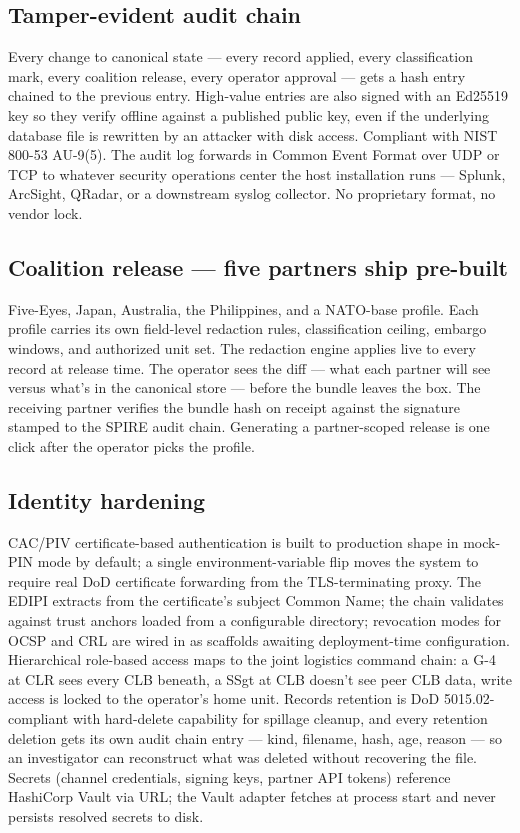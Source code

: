 \documentclass[10.5pt]{extarticle}
\begin{document}
\subsection*{Tamper-evident audit chain}
Every change to canonical state --- every record applied, every
classification mark, every coalition release, every operator
approval --- gets a hash entry chained to the previous entry. High-value
entries are also signed with an Ed25519 key so they verify offline
against a published public key, even if the underlying database file
is rewritten by an attacker with disk access. Compliant with NIST
800-53 AU-9(5). The audit log forwards in Common Event Format over
UDP or TCP to whatever security operations center the host
installation runs --- Splunk, ArcSight, QRadar, or a downstream syslog
collector. No proprietary format, no vendor lock.

\subsection*{Coalition release --- five partners ship pre-built}
Five-Eyes, Japan, Australia, the Philippines, and a NATO-base profile.
Each profile carries its own field-level redaction rules,
classification ceiling, embargo windows, and authorized unit set. The
redaction engine applies live to every record at release time. The
operator sees the diff --- what each partner will see versus what's in
the canonical store --- before the bundle leaves the box. The receiving
partner verifies the bundle hash on receipt against the signature
stamped to the SPIRE audit chain. Generating a partner-scoped release
is one click after the operator picks the profile.

\subsection*{Identity hardening}
CAC/PIV certificate-based authentication is built to production shape
in mock-PIN mode by default; a single environment-variable flip moves
the system to require real DoD certificate forwarding from the
TLS-terminating proxy. The EDIPI extracts from the certificate's
subject Common Name; the chain validates against trust anchors loaded
from a configurable directory; revocation modes for OCSP and CRL are
wired in as scaffolds awaiting deployment-time configuration.
Hierarchical role-based access maps to the joint logistics command
chain: a G-4 at CLR sees every CLB beneath, a SSgt at CLB doesn't see
peer CLB data, write access is locked to the operator's home unit.
Records retention is DoD 5015.02-compliant with hard-delete capability
for spillage cleanup, and every retention deletion gets its own audit
chain entry --- kind, filename, hash, age, reason --- so an investigator
can reconstruct what was deleted without recovering the file. Secrets
(channel credentials, signing keys, partner API tokens) reference
HashiCorp Vault via URL; the Vault adapter fetches at process start and
never persists resolved secrets to disk.
\end{document}
